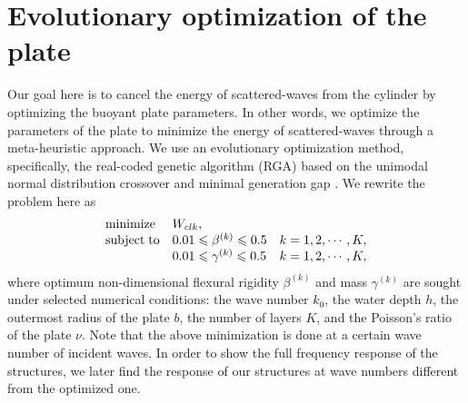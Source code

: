 \documentclass{jfm}
\begin{document}
\section{Evolutionary optimization of the plate}
\label{section:evolutionary}
Our goal here is to cancel the energy of scattered-waves from the cylinder by optimizing the buoyant plate parameters. In other words, we optimize the parameters of the plate to minimize the energy of scattered-waves through a meta-heuristic approach. We use an evolutionary optimization method, specifically, the real-coded genetic algorithm (RGA) based on the unimodal normal distribution crossover and minimal generation gap \cite[]{Ono1999}. We rewrite the problem here as
\begin{eqnarray}
\begin{array}{llr}
{\rm minimize}&W_{clk}, &\\
{\rm subject\; to}&0.01\le \beta^{(k)}\le 0.5&k=1,2,\cdots,K,\\
&0.01\le \gamma^{(k)}\le 0.5&k=1,2,\cdots,K,
\end{array}
\label{eq4:01}
\end{eqnarray}
where optimum non-dimensional flexural rigidity $\beta^{(k)}$ and mass $\gamma^{(k)}$ are sought under selected numerical conditions: the wave number $k_0$, the water depth $h$, the outermost radius of the plate $b$, the number of layers $K$, and the Poisson's ratio of the plate $\nu$. Note that the above minimization is done at a certain wave number of incident waves. In order to show the full frequency response of the structures, we later find the response of our structures at wave numbers different from the optimized one.
\end{document}
